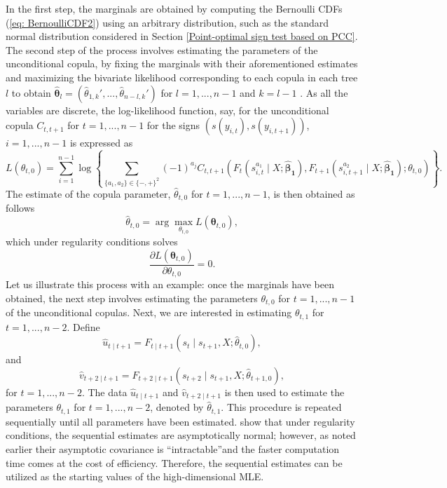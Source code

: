 \documentclass[harvard,11pt]{article}
\begin{document}
In the first step, the marginals are obtained by computing the Bernoulli CDFs (\ref{eq: BernoulliCDF2}) using an arbitrary distribution, such as the standard normal distribution considered in Section \ref{Point-optimal sign test based on PCC}. The second step of the process involves estimating the parameters of the unconditional copula, by fixing the marginals with their aforementioned estimates and maximizing the bivariate likelihood corresponding to each copula in each tree $l$ to obtain $\pmb{\hat{\theta}}_l=(\hat{\theta}_{1,k}',...,\hat{\theta}_{n-l,k}')$ for $l=1,...,n-1$ and $k=l-1$ . As all the variables are discrete, the log-likelihood function, say, for the unconditional copula $C_{t,t+1}$ for $t=1,...,n-1$ for the signs $\left(s(y_{i,t}),s(y_{i,t+1})\right)$, $i=1,...,n-1$ is expressed as 
\[
L(\theta_{t,0})=\sum\limits_{i=1}^{n-1}\log\left\{\sum\limits_{\{a_1,a_2\}\in \{-,+\}^{2}}(-1)^{a_{j}}C_{t,t+1}\left(F_t(s_{i,t}^{a_1}\mid X;\mathbf{\hat{\beta}_1}),F_{t+1}(s_{i,t+1}^{a_2}\mid X;\mathbf{\hat{\beta}_1});\theta_{t,0}\right)\right\}.
\]
The estimate of the copula parameter, $\hat{\theta}_{t,0}$ for $t=1,...,n-1$, is then obtained as follows
\[
\hat{\theta}_{t,0}=\arg \max_{\theta_{t,0}} L(\mathbf{\theta}_{t,0}),
\] 
which under regularity conditions solves
\[
\frac{\partial L(\mathbf{\theta}_{t,0})}{\partial \theta_{t,0}}=0.
\]
Let us illustrate this process with an example: once the marginals have been obtained, the next step involves estimating the parameters $\theta_{t,0}$ for $t=1,...,n-1$ of the unconditional copulas. Next, we are interested in estimating $\theta_{t,1}$ for $t=1,...,n-2$. Define
\[
\hat{u}_{t\mid t+1}=F_{t\mid t+1}\left(s_t\mid s_{t+1},X;\hat{\theta}_{t,0} \right),
\]  
and
\[
\hat{v}_{t+2\mid t+1}=F_{t+2\mid t+1}\left(s_{t+2}\mid s_{t+1},X;\hat{\theta}_{t+1,0} \right),
\]
for $t=1,...,n-2$. The data $\hat{u}_{t\mid t+1}$ and $\hat{v}_{t+2\mid t+1}$ is then used to estimate the parameters $\theta_{t,1}$ for $t=1,...,n-2$, denoted by $\hat{\theta}_{t,1}$. This procedure is repeated sequentially until all parameters have been estimated. \citet{haff2010simplified} show that under regularity conditions, the sequential estimates are asymptotically normal; however, as noted earlier their asymptotic covariance is \textquotedblleft intractable\textquotedblright and the faster computation time comes at the cost of efficiency. Therefore, the sequential estimates can be utilized as the starting values of the high-dimensional MLE.
\end{document}
